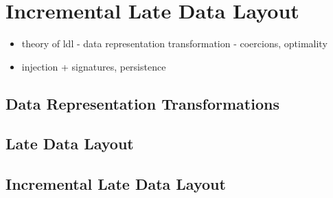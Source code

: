 \section{Incremental Late Data Layout}
\label{sec:ildl}
\begin{itemize}
  \item theory of ldl - data representation transformation - coercions, optimality
  \item injection + signatures, persistence
\end{itemize}


\subsection{Data Representation Transformations}







\subsection {Late Data Layout}








\subsection{Incremental Late Data Layout}





